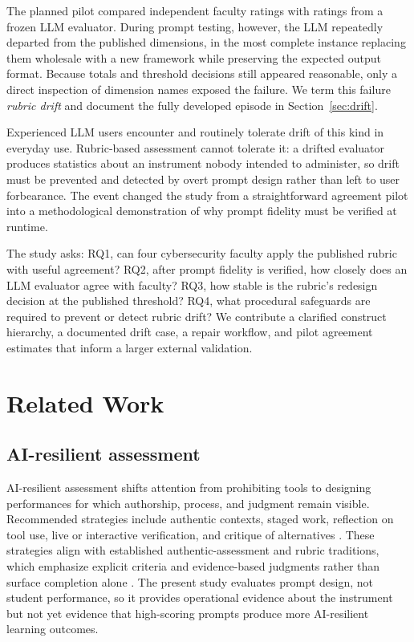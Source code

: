 \documentclass[sigconf]{acmart}
\begin{document}
The planned pilot compared independent faculty ratings with ratings from a frozen LLM evaluator. During prompt testing, however, the LLM repeatedly departed from the published dimensions, in the most complete instance replacing them wholesale with a new framework while preserving the expected output format. Because totals and threshold decisions still appeared reasonable, only a direct inspection of dimension names exposed the failure. We term this failure \emph{rubric drift} and document the fully developed episode in Section~\ref{sec:drift}.

Experienced LLM users encounter and routinely tolerate drift of this kind in everyday use. Rubric-based assessment cannot tolerate it: a drifted evaluator produces statistics about an instrument nobody intended to administer, so drift must be prevented and detected by overt prompt design rather than left to user forbearance. The event changed the study from a straightforward agreement pilot into a methodological demonstration of why prompt fidelity must be verified at runtime.

The study asks: RQ1, can four cybersecurity faculty apply the published rubric with useful agreement? RQ2, after prompt fidelity is verified, how closely does an LLM evaluator agree with faculty? RQ3, how stable is the rubric's redesign decision at the published threshold? RQ4, what procedural safeguards are required to prevent or detect rubric drift? We contribute a clarified construct hierarchy, a documented drift case, a repair workflow, and pilot agreement estimates that inform a larger external validation.

\section{Related Work}
\subsection{AI-resilient assessment}
AI-resilient assessment shifts attention from prohibiting tools to designing performances for which authorship, process, and judgment remain visible. Recommended strategies include authentic contexts, staged work, reflection on tool use, live or interactive verification, and critique of alternatives \cite{akbar2025beyond,fowler2023ai,jongkind2026curriculum,mccauley2025undergraduate}. These strategies align with established authentic-assessment and rubric traditions, which emphasize explicit criteria and evidence-based judgments rather than surface completion alone \cite{rhodes2013value}. The present study evaluates prompt design, not student performance, so it provides operational evidence about the instrument but not yet evidence that high-scoring prompts produce more AI-resilient learning outcomes.
\end{document}
